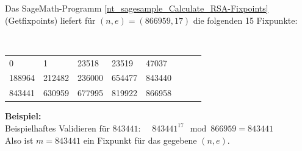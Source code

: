 \begin{refsegment}
  \noindent Das SageMath-Programm \ref{nt_sagesample_Calculate_RSA-Fixpoints} (Getfixpoints) liefert für $(n,e) = (866959, 17)$ die folgenden 15 Fixpunkte:
%
%
%
\begin{table}[ht]
\begin{center}
{\tt
\begin{tabular}{llllllll}
     0 &      1 &  23518 &  23519 &  47037\\
188964 & 212482 & 236000 & 654477 & 843440\\
843441 & 630959 & 677995 & 819922 & 866958
\end{tabular} } %
\end{center}
\end{table}

\noindent \textbf{Beispiel:}\\
Beispielhaftes Validieren für $ 843441 $:~~
$843441^{17} \mod 866959 = 843441$\\
Also ist $ m = 843441$ ein Fixpunkt für das gegebene $(n,e)$.\\


\end{refsegment}
